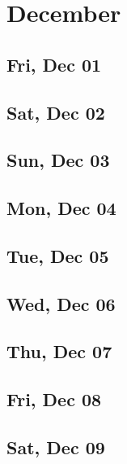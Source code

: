 \chapter{December}
	\section{Fri, Dec 01}
		
	\section{Sat, Dec 02}
		
	\section{Sun, Dec 03}
		
	\section{Mon, Dec 04}
		
	\section{Tue, Dec 05}
		
	\section{Wed, Dec 06}
		
	\section{Thu, Dec 07}
		
	\section{Fri, Dec 08}
		
	\section{Sat, Dec 09}
		
